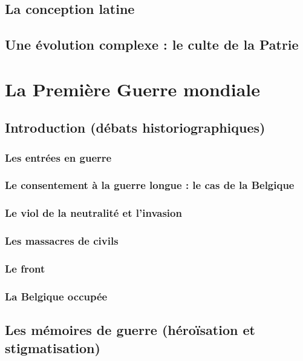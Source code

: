 \documentclass[12pt]{report}
\begin{document}
\section{La conception latine}

\section{Une évolution complexe : le culte de la Patrie}


\chapter{La Première Guerre mondiale}

\section*{Introduction (débats historiographiques)}

\subsection{Les entrées en guerre}

\subsection{Le consentement à la guerre longue : le cas de la Belgique}

\subsection{Le viol de la neutralité et l'invasion}

\subsection{Les massacres de civils}

\subsection{Le front}

\subsection{La Belgique occupée}

\section{Les mémoires de guerre (héroïsation et stigmatisation)}
\end{document}
